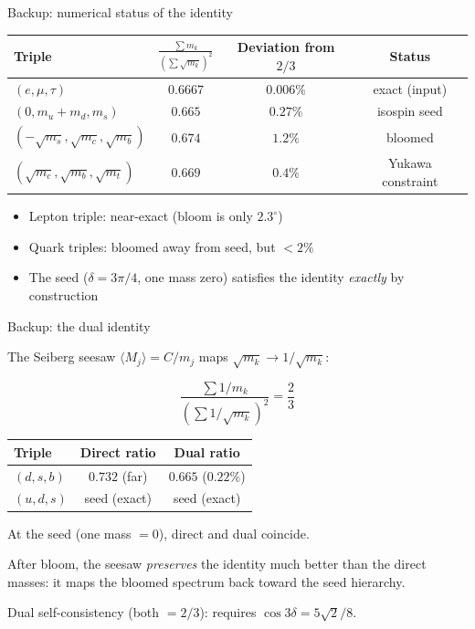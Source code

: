 \documentclass[aspectratio=169,12pt]{beamer}
\begin{document}
\begin{frame}{Backup: numerical status of the identity}

\small
\begin{center}
\begin{tabular}{lccc}
\toprule
Triple & $\displaystyle\frac{\sum m_k}{(\sum\sqrt{m_k})^2}$
  & Deviation from $2/3$ & Status \\
\midrule
$(e,\mu,\tau)$ & $0.6667$ & $0.006\%$ & exact (input) \\[4pt]
$(0, m_u{+}m_d, m_s)$ & $0.665$ & $0.27\%$ & isospin seed \\[4pt]
$(-\sqrt{m_s},\sqrt{m_c},\sqrt{m_b})$ & $0.674$
  & $1.2\%$ & bloomed \\[4pt]
$(\sqrt{m_c},\sqrt{m_b},\sqrt{m_t})$ & $0.669$
  & $0.4\%$ & Yukawa constraint \\
\bottomrule
\end{tabular}
\end{center}

\bigskip
\begin{itemize}
\item Lepton triple: near-exact (bloom is only $2.3^\circ$)
\item Quark triples: bloomed away from seed, but $< 2\%$
\item The seed ($\delta = 3\pi/4$, one mass zero) satisfies
  the identity \emph{exactly} by construction
\end{itemize}

\end{frame}

\begin{frame}{Backup: the dual identity}

The Seiberg seesaw $\langle M_j\rangle = C/m_j$ maps
$\sqrt{m_k} \to 1/\sqrt{m_k}$:

\begin{equation*}
\frac{\sum 1/m_k}{(\sum 1/\sqrt{m_k})^2} = \frac{2}{3}
\end{equation*}

\medskip
\begin{center}
\begin{tabular}{lcc}
\toprule
Triple & Direct ratio & Dual ratio \\
\midrule
$(d,s,b)$ & $0.732$ (far) & $0.665$ ($0.22\%$) \\
$(u,d,s)$ & seed (exact) & seed (exact) \\
\bottomrule
\end{tabular}
\end{center}

\bigskip
At the seed (one mass $= 0$), direct and dual coincide.

After bloom, the seesaw \emph{preserves} the identity much
better than the direct masses: it maps the bloomed spectrum
back toward the seed hierarchy.

\medskip
Dual self-consistency (both $= 2/3$): requires
$\cos 3\delta = 5\sqrt{2}/8$.

\end{frame}
\end{document}
